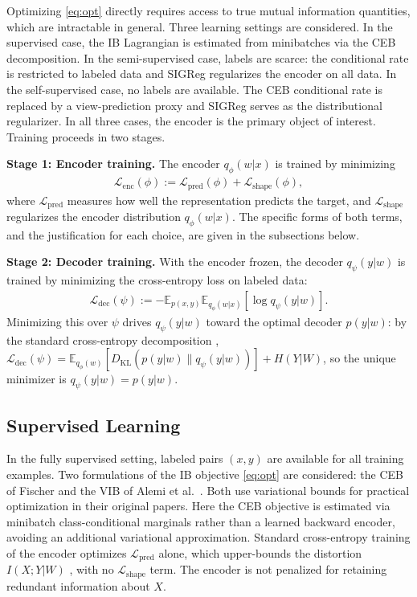 \documentclass[11pt]{article}
\begin{document}
Optimizing \eqref{eq:opt} directly requires access to true mutual
information quantities, which are intractable in general.
Three learning settings are considered.
In the supervised case, the IB Lagrangian is estimated from
minibatches via the CEB decomposition.
In the semi-supervised case, labels are scarce: the conditional rate
is restricted to labeled data and SIGReg regularizes the encoder on
all data.
In the self-supervised case, no labels are available. The CEB
conditional rate is replaced by a view-prediction proxy and SIGReg
serves as the distributional regularizer.
In all three cases, the encoder is the primary object of interest.
Training proceeds in two stages.

\medskip
\noindent\textbf{Stage 1: Encoder training.}
The encoder $q_\phi(w|x)$ is trained by minimizing
\begin{align}
    \mathcal{L}_{\mathrm{enc}}(\phi) :=
    \mathcal{L}_{\mathrm{pred}}(\phi) +
    \mathcal{L}_{\mathrm{shape}}(\phi),
    \label{eq:enc_loss}
\end{align}
where $\mathcal{L}_{\mathrm{pred}}$ measures how well the representation
predicts the target, and $\mathcal{L}_{\mathrm{shape}}$ 
regularizes the encoder distribution $q_\phi(w|x)$.
The specific forms of both terms, and the justification for each choice,
are given in the subsections below.

\medskip
\noindent\textbf{Stage 2: Decoder training.}
With the encoder frozen, the decoder $q_\psi(y|w)$ is trained by
minimizing the cross-entropy loss on labeled data:
\begin{align}
    \mathcal{L}_{\mathrm{dec}}(\psi) :=
    -\mathbb{E}_{p(x,y)}\mathbb{E}_{q_\phi(w|x)}
    [\log q_\psi(y|w)].
    \label{eq:dec_loss}
\end{align}
Minimizing this over $\psi$ drives $q_\psi(y|w)$ toward the optimal
decoder $p(y|w)$: by the standard cross-entropy decomposition
\cite{bishop2006pattern}, $\mathcal{L}_{\mathrm{dec}}(\psi) =
\mathbb{E}_{q_\phi(w)}[D_{\mathrm{KL}}(p(y|w)\|q_\psi(y|w))] +
H(Y|W)$, so the unique minimizer is $q_\psi(y|w)=p(y|w)$.

\subsection{Supervised Learning}
\label{sec:supervised}

In the fully supervised setting, labeled pairs $(x,y)$ are available
for all training examples.
Two formulations of the IB objective \eqref{eq:opt} are considered:
the CEB of Fischer
\cite{fischer2020conditional} and the VIB of Alemi et al.\ \cite{alemi2017deep}.
Both use variational bounds for practical optimization in their
original papers.
Here the CEB objective is estimated via minibatch class-conditional
marginals rather than a learned backward encoder, avoiding an
additional variational approximation.
Standard cross-entropy training of the encoder optimizes
$\mathcal{L}_{\mathrm{pred}}$ alone, which upper-bounds the
distortion $I(X;Y|W)$ \cite{alemi2017deep}, with no
$\mathcal{L}_{\mathrm{shape}}$ term. The encoder is not penalized for
retaining redundant information about $X$.
\end{document}
